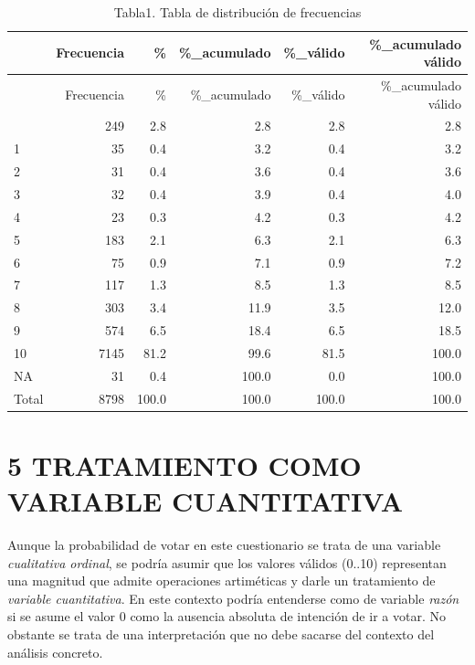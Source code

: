 \documentclass[
]{article}
\newenvironment{Shaded}{\begin{snugshade}}{\end{snugshade}}
\newcommand{\CommentTok}[1]{\textcolor[rgb]{0.56,0.35,0.01}{\textit{#1}}}
\begin{document}
\begin{longtable}[]{@{}lrrrrr@{}}
\caption{Tabla1. Tabla de distribución de frecuencias}\tabularnewline
\toprule\noalign{}
& Frecuencia & \% & \%\_acumulado & \%\_válido & \%\_acumulado válido \\
\midrule\noalign{}
\endfirsthead
\toprule\noalign{}
& Frecuencia & \% & \%\_acumulado & \%\_válido & \%\_acumulado válido \\
\midrule\noalign{}
\endhead
\bottomrule\noalign{}
\endlastfoot
0 & 249 & 2.8 & 2.8 & 2.8 & 2.8 \\
1 & 35 & 0.4 & 3.2 & 0.4 & 3.2 \\
2 & 31 & 0.4 & 3.6 & 0.4 & 3.6 \\
3 & 32 & 0.4 & 3.9 & 0.4 & 4.0 \\
4 & 23 & 0.3 & 4.2 & 0.3 & 4.2 \\
5 & 183 & 2.1 & 6.3 & 2.1 & 6.3 \\
6 & 75 & 0.9 & 7.1 & 0.9 & 7.2 \\
7 & 117 & 1.3 & 8.5 & 1.3 & 8.5 \\
8 & 303 & 3.4 & 11.9 & 3.5 & 12.0 \\
9 & 574 & 6.5 & 18.4 & 6.5 & 18.5 \\
10 & 7145 & 81.2 & 99.6 & 81.5 & 100.0 \\
NA & 31 & 0.4 & 100.0 & 0.0 & 100.0 \\
Total & 8798 & 100.0 & 100.0 & 100.0 & 100.0 \\
\end{longtable}

\begin{Shaded}
\end{Shaded}

\hypertarget{tratamiento-como-variable-cuantitativa}{%
\section{5 TRATAMIENTO COMO VARIABLE
CUANTITATIVA}\label{tratamiento-como-variable-cuantitativa}}

Aunque la probabilidad de votar en este cuestionario se trata de una
variable \emph{cualitativa ordinal}, se podría asumir que los valores
válidos (0..10) representan una magnitud que admite operaciones
artiméticas y darle un tratamiento de \emph{variable cuantitativa}. En
este contexto podría entenderse como de variable \emph{razón} si se
asume el valor 0 como la ausencia absoluta de intención de ir a votar.
No obstante se trata de una interpretación que no debe sacarse del
contexto del análisis concreto.
\end{document}
